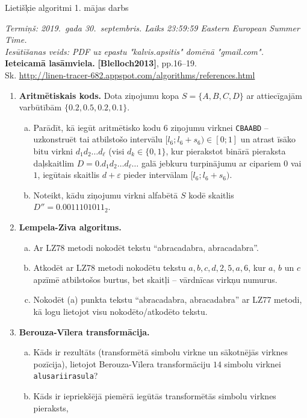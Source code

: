 \documentclass[11pt]{article}
\begin{document}
\thispagestyle{empty}

{\Large Lietišķie algoritmi \textendash{} 1. mājas darbs}

\noindent
{\em Termiņš: 2019.\ gada 30.\ septembris. Laiks 23:59:59 Eastern European Summer Time.}\\
{\em Iesūtīšanas veids: PDF uz epastu "kalvis.apsitis" domēnā "gmail.com".}\\
{\bf Ieteicamā lasāmviela.} {\bf [Blelloch2013]}, pp.16--19.\\
Sk. \url{http://linen-tracer-682.appspot.com/algorithms/references.html}

\begin{enumerate}
\item {\bf Aritmētiskais kods.} 
Dota ziņojumu kopa $S = \{ A,B,C,D \}$ ar attiecīgajām varbūtībām 
$\{ 0.2, 0.5, 0.2, 0.1 \}$.
\begin{enumerate}[(a)]
\item Parādīt, kā iegūt aritmētisko kodu $6$ ziņojumu virknei {\tt CBAABD} -- uzkonstruēt
tai atbilstošo intervālu $[l_6;l_6+s_6) \in [0;1]$ un atrast 
īsāko bitu virkni $d_1d_2\ldots{}d_{\ell}$ (visi $d_k \in \{ 0,1 \}$, 
kur pierakstot binārā pieraksta daļskaitlim $D = 0.d_1d_2\ldots{}d_{\ell}\ldots$ 
galā jebkuru turpinājumu ar cipariem $0$ vai $1$, iegūtais skaitlis $d+\varepsilon$ pieder
intervālam $[l_6;l_6+s_6)$.
\item Noteikt, kādu ziņojumu virkni alfabētā $S$ kodē skaitlis 
$D'' = 0.0011101011_2$.
\end{enumerate}
\item {\bf Lempela-Ziva algoritms.} 
\begin{enumerate}[(a)]
\item 
Ar LZ78 metodi nokodēt tekstu “abracadabra, abracadabra”.
\item Atkodēt ar LZ78 metodi nokodētu tekstu $a,b,c,d,2,5,a,6$, kur
$a$, $b$ un $c$ apzīmē atbilstošos burtus, bet skaitļi – vārdnīcas virkņu
numurus.
\item
Nokodēt (a) punkta tekstu “abracadabra, abracadabra” 
ar LZ77 metodi, kā logu lietojot visu nokodēto/atkodēto tekstu.
\end{enumerate}
\item {\bf Berouza-Vīlera transformācija.}
\begin{enumerate}[(a)]
\item 
Kāds ir rezultāts (transformētā simbolu virkne un sākotnējās virknes pozīcija), 
lietojot Berouza-Vīlera transformāciju 
$14$ simbolu virknei {\tt alusariirasula}?
\item Kāds ir iepriekšējā piemērā iegūtās transformētās simbolu virknes pieraksts,

\end{enumerate}
\end{enumerate}
\end{document}
